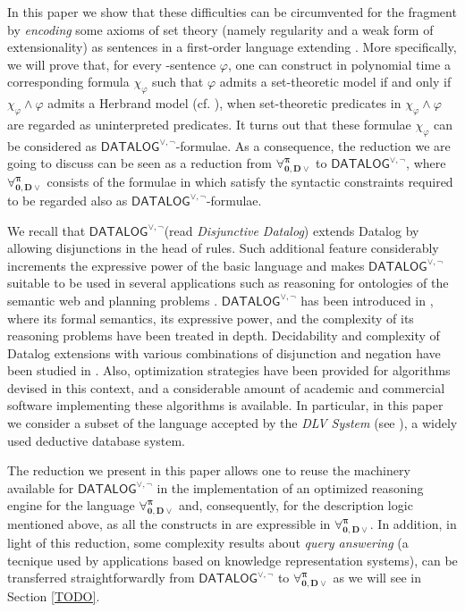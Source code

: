 \documentclass[manyauthors]{fundam}
\newcommand{\DisjDatalog}{\ensuremath{\mathsf{DATALOG}^{\vee,\neg}}\xspace}
\newcommand{\ForallpizeroDisjDatalog}{\ensuremath{\mathbf{\forall_{0,D\vee}^{\pi}}}\xspace}
\begin{document}
In this paper we show that these difficulties can be circumvented for
the fragment \Forallpizero by \emph{encoding} some axioms of set
theory (namely regularity and a weak form of extensionality) as
sentences in a first-order language extending \Forallpizero.
More specifically, we will prove that, for
every \Forallpizero-sentence $\varphi$, one can construct in polynomial
time a corresponding formula $\chi_{\varphi}$ such that
$\varphi$ admits a set-theoretic model if and only if
$\chi_{\varphi} \wedge \varphi$ admits a Herbrand model (cf.
\cite{Her2002}), when set-theoretic predicates in $\chi_{\varphi}
\wedge \varphi$ are regarded as uninterpreted predicates.
%
It turns out that these formulae $\chi_{\varphi}$ can be considered
as \DisjDatalog-formulae. As a consequence, the reduction we
are going to discuss can be seen as a reduction from
\ForallpizeroDisjDatalog to \DisjDatalog, where
$\ForallpizeroDisjDatalog$
consists of the formulae in \Forallpizero which satisfy
the syntactic constraints required to be regarded also as 
\DisjDatalog-formulae.

We recall that \DisjDatalog (read \emph{Disjunctive Datalog})
extends Datalog by allowing disjunctions in the
head of rules. Such additional feature considerably increments the expressive power of the basic language and makes \DisjDatalog suitable to be used in several applications such as reasoning for ontologies of the semantic web \cite{hustadt2007reasoning} and planning problems \cite{Eiter:2004}. 
\DisjDatalog has been introduced in \cite{EitGotMan1997}, where its formal semantics, its expressive power, and the complexity of its reasoning problems have been treated in depth. Decidability and complexity of Datalog
extensions with various combinations of disjunction and negation have
been studied in \cite{AlvFabLeoMan2012,GottlobMMP12}.
Also, optimization strategies have been provided for
algorithms devised in this context, and a considerable amount of
academic and commercial software implementing these algorithms is
available. In particular, in this paper we consider a subset of the language
accepted by the \emph{DLV System} (see \cite{AlvFabLeoPerPfeTer2011,LeoPfeFabEitGotPerSca2006}), 
a widely used deductive database system.
  
The reduction we present in this paper allows one to reuse the machinery
available for \DisjDatalog in the implementation of an optimized
reasoning engine for the language \ForallpizeroDisjDatalog and,
consequently, for the description logic \dlForallpizero mentioned
above, as all the constructs in \dlForallpizero are expressible in
\ForallpizeroDisjDatalog. In addition, in light of this
reduction, some complexity 
results about \emph{query answering}
(a tecnique used by applications based on knowledge representation systems),
can be transferred straightforwardly from \DisjDatalog to \ForallpizeroDisjDatalog 
as we will see in Section \ref{TODO}.    
\end{document}

